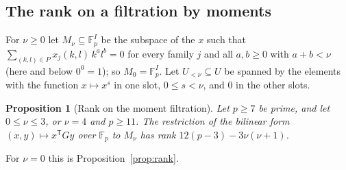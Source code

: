 \documentclass[11pt]{article}
\newtheorem{proposition}[theorem]{Proposition}
\theoremstyle{definition}
\theoremstyle{remark}
\newcommand{\F}{\mathbb{F}}
\begin{document}
\subsection{The rank on a filtration by moments}

For $\nu\ge0$ let $M_\nu\subseteq\F_p^I$ be the subspace of the $x$ such that $\sum_{(k,l)\in P}x_j(k,l)\,k^al^b=0$ for every family $j$ and all $a,b\ge0$ with $a+b<\nu$ (here and below $0^0=1$); so $M_0=\F_p^I$. Let $U_{<\nu}\subseteq U$ be spanned by the elements with the function $x\mapsto x^s$ in one slot, $0\le s<\nu$, and $0$ in the other slots.

\begin{proposition}[Rank on the moment filtration]\label{prop:ladder}
Let $p\ge7$ be prime, and let $0\le \nu\le3$, or $\nu=4$ and $p\ge11$. The restriction of the bilinear form $(x,y)\mapsto x^{\mathsf T}Gy$ over $\F_p$ to $M_\nu$ has rank $12(p-3)-3\nu(\nu+1)$.
\end{proposition}

For $\nu=0$ this is Proposition~\ref{prop:rank}.
\end{document}
